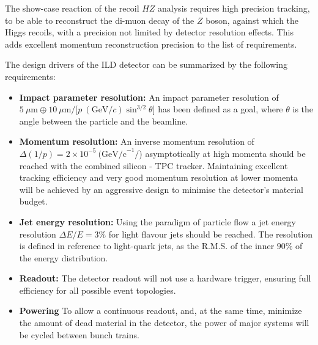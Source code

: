 \documentclass[%
 amsmath,amssymb,
 aps,
 longbibliography,
]{revtex4-1}
\begin{document}
The show-case reaction of the recoil $HZ$ analysis requires high precision tracking, to be able to reconstruct the di-muon decay of the $Z$ boson, against which the Higgs recoils, with a precision not limited by detector resolution effects. This adds excellent momentum reconstruction precision to the list of requirements. 

The design drivers of the ILD detector can be summarized by the following requirements: 
\begin{itemize}
    \item {\bf Impact parameter resolution:}  An impact parameter resolution of $ 5~\mu \mathrm{m} \oplus 10~\mu \mathrm{m} / [ p~({\mathrm{GeV}/c})\sin^{3/2}\theta$] has been defined as a goal, where $\theta$ is the angle between the particle and the beamline. 
    \item {\bf Momentum resolution:} An inverse momentum resolution of $\Delta (1 / p) = 2 \times 10^{-5}~\mathrm{(GeV/c}^{-1}/$) asymptotically at high momenta should be reached with the combined silicon - TPC tracker. Maintaining excellent tracking efficiency and very good momentum resolution at lower momenta will be achieved by an aggressive design to minimise the detector's material budget.
    \item {\bf Jet energy resolution:} Using the paradigm of particle flow a jet energy resolution $\Delta E/ E = 3\%$ for light flavour jets should be reached. The resolution is defined in reference to light-quark jets, as the R.M.S. of the inner $90\%$ of the energy distribution. 
    \item {\bf Readout:} The detector readout will not use a hardware trigger, ensuring full efficiency for all possible event topologies.
    \item {\bf Powering} To allow a continuous readout, and, at the same time, minimize the amount of dead material in the detector, the power of major systems will be cycled between bunch trains. 
\end{itemize}
\end{document}
